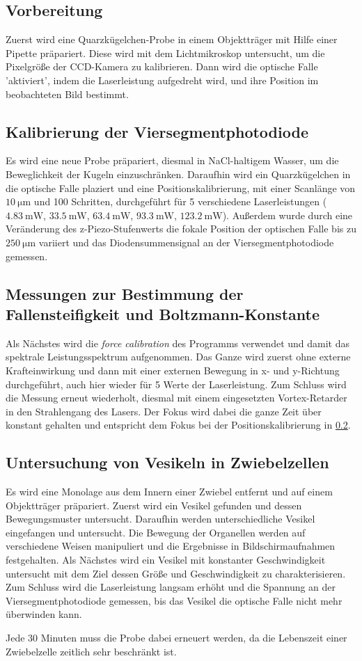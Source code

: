   \subsection{Vorbereitung}
    Zuerst wird eine Quarzkügelchen-Probe in einem Objektträger mit Hilfe einer Pipette präpariert. Diese wird mit dem Lichtmikroskop untersucht, um die Pixelgröße der CCD-Kamera zu kalibrieren. Dann wird die optische Falle 'aktiviert', indem die Laserleistung aufgedreht wird, und ihre Position im beobachteten Bild bestimmt.
  \subsection{Kalibrierung der Viersegmentphotodiode}
  \label{sec:Kalib}
    Es wird eine neue Probe präpariert, diesmal in NaCl-haltigem Wasser, um die Beweglichkeit der Kugeln einzuschränken. Daraufhin wird ein Quarzkügelchen in die optische Falle plaziert und eine Positionskalibrierung, mit einer Scanlänge von $\SI{10}{\micro\metre}$ und 100 Schritten, durchgeführt für 5 verschiedene Laserleistungen ($\SI{4.83}{\milli\watt}$, $\SI{33.5}{\milli\watt}$, $\SI{63.4}{\milli\watt}$, $\SI{93.3}{\milli\watt}$, $\SI{123.2}{\milli\watt}$).
    Außerdem wurde durch eine Veränderung des z-Piezo-Stufenwerts die fokale Position der optischen Falle bis zu $\SI{250}{\micro\metre}$ variiert und das Diodensummensignal an der Viersegmentphotodiode gemessen.
  \subsection{Messungen zur Bestimmung der Fallensteifigkeit und Boltzmann-Konstante}
    Als Nächstes wird die \textit{force calibration} des Programms verwendet und damit das spektrale Leistungsspektrum aufgenommen. Das Ganze wird zuerst ohne externe Krafteinwirkung und dann mit einer externen Bewegung in x- und y-Richtung durchgeführt, auch hier wieder für 5 Werte der Laserleistung. Zum Schluss wird die Messung erneut wiederholt, diesmal mit einem eingesetzten Vortex-Retarder in den Strahlengang des Lasers.
    Der Fokus wird dabei die ganze Zeit über konstant gehalten und entspricht dem Fokus bei der Positionskalibrierung in \ref{sec:Kalib}.
  \subsection{Untersuchung von Vesikeln in Zwiebelzellen}
    Es wird eine Monolage aus dem Innern einer Zwiebel entfernt und auf einem Objektträger präpariert.
    Zuerst wird ein Vesikel gefunden und dessen Bewegungsmuster untersucht. Daraufhin werden unterschiedliche Vesikel eingefangen und untersucht. Die Bewegung der Organellen werden auf verschiedene Weisen manipuliert und die Ergebnisse in Bildschirmaufnahmen festgehalten.
    Als Nächstes wird ein Vesikel mit konstanter Geschwindigkeit untersucht mit dem Ziel dessen Größe und Geschwindigkeit zu charakterisieren.
    Zum Schluss wird die Laserleistung langsam erhöht und die Spannung an der Viersegmentphotodiode gemessen, bis das Vesikel die optische Falle nicht mehr überwinden kann.
    
    Jede 30 Minuten muss die Probe dabei erneuert werden, da die Lebenszeit einer Zwiebelzelle zeitlich sehr beschränkt ist.